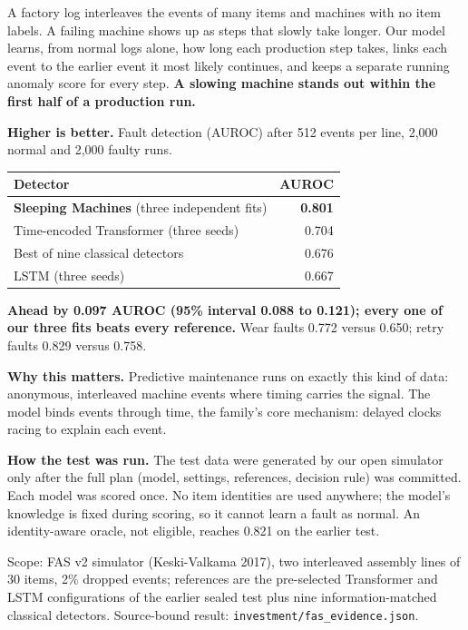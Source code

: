 \documentclass[10pt, a4 paper]{article}
\begin{document}
A factory log interleaves the events of many items and machines with no item
labels. A failing machine shows up as steps that slowly take longer. Our model
learns, from normal logs alone, how long each production step takes, links each
event to the earlier event it most likely continues, and keeps a separate running
anomaly score for every step. \textbf{A slowing machine stands out within the first
half of a production run.}

\begin{tile}
\textbf{Higher is better.} Fault detection (AUROC) after 512 events per line, 2,000 normal and 2,000 faulty runs.
\begin{center}
\begin{tabular}{lr}
\toprule
Detector & AUROC \\
\midrule
\textbf{Sleeping Machines} (three independent fits) & \textbf{0.801} \\
Time-encoded Transformer (three seeds) & 0.704 \\
Best of nine classical detectors & 0.676 \\
LSTM (three seeds) & 0.667 \\
\bottomrule
\end{tabular}
\end{center}
\textbf{Ahead by 0.097 AUROC (95\% interval 0.088 to 0.121); every one of our three
fits beats every reference.} Wear faults 0.772 versus 0.650; retry faults 0.829 versus 0.758.
\end{tile}

\textbf{Why this matters.} Predictive maintenance runs on exactly this kind of data:
anonymous, interleaved machine events where timing carries the signal. The model binds events through time, the family's core mechanism: delayed clocks racing to explain each event.

\textbf{How the test was run.} The test data were generated by our open simulator only
after the full plan (model, settings, references, decision rule) was committed. Each
model was scored once. No item identities are used anywhere; the model's knowledge is
fixed during scoring, so it cannot learn a fault as normal. An identity-aware oracle,
not eligible, reaches 0.821 on the earlier test.

{\footnotesize\color{muted}Scope: FAS v2 simulator (Keski-Valkama 2017), two interleaved
assembly lines of 30 items, 2\% dropped events; references are the pre-selected
Transformer and LSTM configurations of the earlier sealed test plus nine information-matched
classical detectors. Source-bound result: \texttt{investment/fas\_evidence.json}.}
\end{document}
